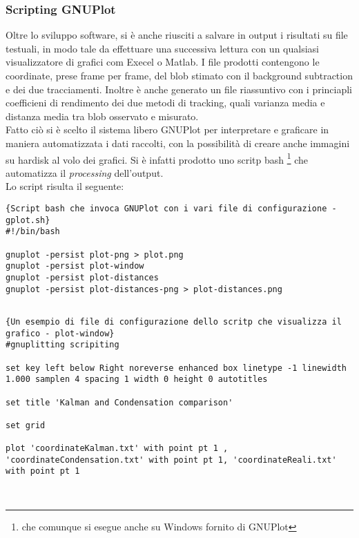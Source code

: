 \subsubsection{Scripting GNUPlot}
Oltre lo sviluppo software, si è anche riusciti a salvare in output i risultati su file testuali, in modo tale da effettuare una successiva lettura con un qualsiasi visualizzatore di grafici com Execel o Matlab. I file prodotti contengono le coordinate, prese frame per frame, del blob stimato con il background subtraction e dei due tracciamenti. Inoltre è anche generato un file riassuntivo con i princiapli coefficieni di rendimento dei due metodi di tracking, quali varianza media e distanza media tra blob osservato e misurato.\\
Fatto ciò si è scelto il sistema libero GNUPlot per interpretare e graficare in maniera automatizzata i dati raccolti, con la possibilità di creare anche immagini su hardisk al volo dei grafici. Si è infatti prodotto uno scritp bash \footnote{che comunque si esegue anche su Windows fornito di GNUPlot} che automatizza il \textit{processing} dell'output.\\
Lo script risulta il seguente:

\lstset{language=bash}
\lstset{commentstyle=\emph}
\begin{lstlisting}[frame=r,caption=Script bash che invoca GNUPlot con i vari file di configurazione - gplot.sh ,breaklines=true,basicstyle=\small]{Script bash che invoca GNUPlot con i vari file di configurazione - gplot.sh}
#!/bin/bash

gnuplot -persist plot-png > plot.png
gnuplot -persist plot-window 
gnuplot -persist plot-distances
gnuplot -persist plot-distances-png > plot-distances.png


\end{lstlisting}


\lstset{language=bash}
\lstset{commentstyle=\emph}
\begin{lstlisting}[frame=r,caption=Un esempio di file di configurazione dello scritp che visualizza il grafico - plot-window ,breaklines=true,basicstyle=\scriptsize]{Un esempio di file di configurazione dello scritp che visualizza il grafico - plot-window}
#gnuplitting scripiting

set key left below Right noreverse enhanced box linetype -1 linewidth 1.000 samplen 4 spacing 1 width 0 height 0 autotitles

set title 'Kalman and Condensation comparison'

set grid

plot 'coordinateKalman.txt' with point pt 1 , 'coordinateCondensation.txt' with point pt 1, 'coordinateReali.txt' with point pt 1



\end{lstlisting}